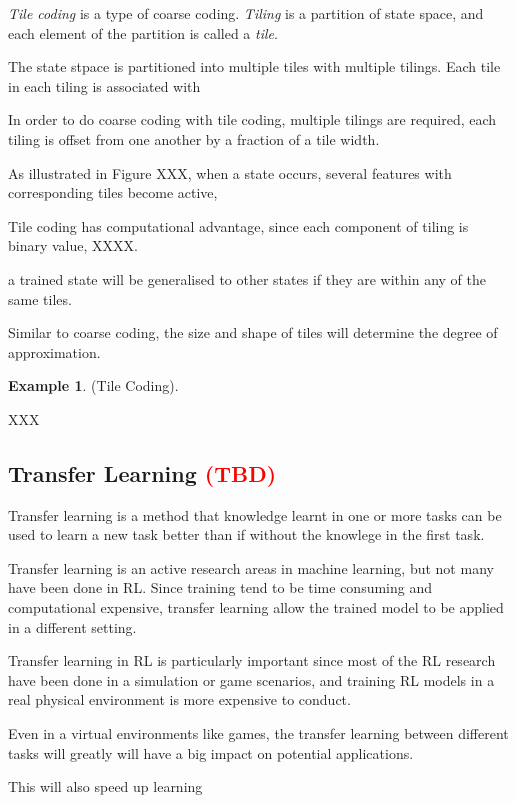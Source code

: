 \documentclass[12pt,twoside]{report}
\theoremstyle{plain}
\theoremstyle{definition}
\newtheorem{examp}{Example}[section]
\begin{document}
\textit{Tile coding} is a type of coarse coding. \textit{Tiling} is a partition of state space, and each element of the partition is called a \textit{tile}.

The state stpace is partitioned into multiple tiles with multiple tilings. Each tile in each tiling is associated with

In order to do coarse coding with tile coding, multiple tilings are required, each tiling is offset from one another by a fraction of a tile width.

As illustrated in Figure XXX, when a state occurs, several features with corresponding tiles become active,

Tile coding has computational advantage, since each component of tiling is binary value,  XXXX.

a trained state will be generalised to other states if they are within any of the same tiles.

Similar to coarse coding, the size and shape of tiles will determine the degree of approximation.

\begin{examp} \normalfont (Tile Coding).

XXX
\end{examp}

\subsection{Transfer Learning \textcolor{red}{(TBD)}}
\label{transfer_learning}

Transfer learning is a method that knowledge learnt in one or more tasks can be used to learn a new task better than if without the knowlege in the first task.

Transfer learning is an active research areas in machine learning, but not many have been done in RL.
Since training tend to be time consuming and computational expensive, transfer learning allow the trained model to be applied in a different setting.

Transfer learning in RL is particularly important since most of the RL research have been done in a simulation or game scenarios, and training RL models in a real physical environment is more expensive to conduct.

Even in a virtual environments like games,  the transfer learning between different tasks will greatly will have a big impact on potential applications.

This will also speed up learning
\end{document}
